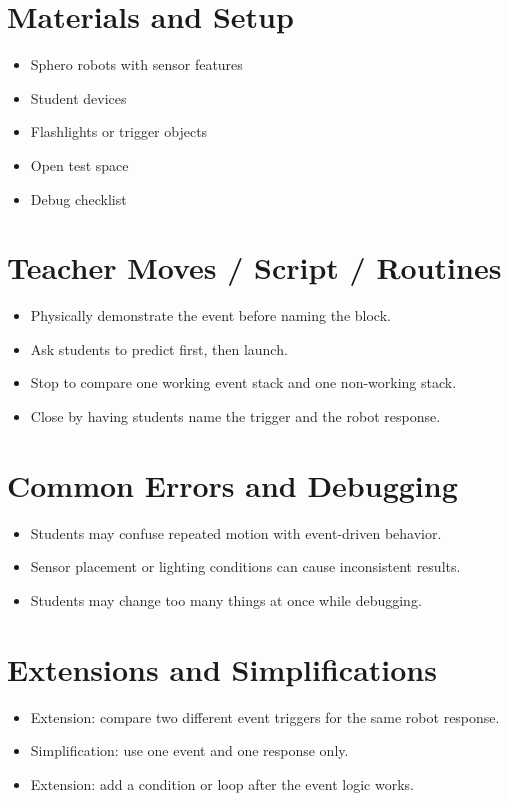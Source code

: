 \documentclass[11pt]{article}
\begin{document}
\section*{Materials and Setup}
\begin{itemize}[leftmargin=*]
\item Sphero robots with sensor features
\item Student devices
\item Flashlights or trigger objects
\item Open test space
\item Debug checklist
\end{itemize}

\section*{Teacher Moves / Script / Routines}
\begin{itemize}[leftmargin=*]
\item Physically demonstrate the event before naming the block.
\item Ask students to predict first, then launch.
\item Stop to compare one working event stack and one non-working stack.
\item Close by having students name the trigger and the robot response.
\end{itemize}

\section*{Common Errors and Debugging}
\begin{itemize}[leftmargin=*]
\item Students may confuse repeated motion with event-driven behavior.
\item Sensor placement or lighting conditions can cause inconsistent results.
\item Students may change too many things at once while debugging.
\end{itemize}

\section*{Extensions and Simplifications}
\begin{itemize}[leftmargin=*]
\item Extension: compare two different event triggers for the same robot response.
\item Simplification: use one event and one response only.
\item Extension: add a condition or loop after the event logic works.
\end{itemize}
\end{document}
